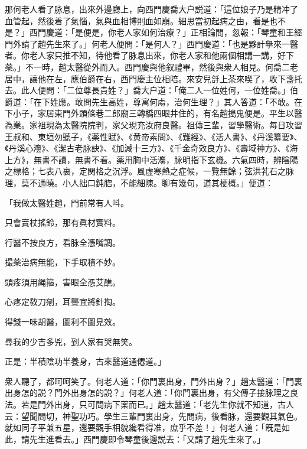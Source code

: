那何老人看了脉息，出來外邊廳上，向西門慶喬大户説道：「這位娘子乃是精冲了血管起，然後着了氣惱，氣與血相博則血如崩。細思當初起病之由，看是也不是？」西門慶道：「是便是，你老人家如何治療？」正相論間，忽報：「琴童和王經門外請了趙先生來了。」何老人便問：「是何人？」西門慶道：「也是夥計擧來一醫者。你老人家只推不知，待他看了脉息出來，你老人家和他兩個相講一講，好下薬。」不一時，趙太醫從外而入。西門慶與他叙禮畢，然後與衆人相見。何喬二老居中，讓他在左，應伯爵在右，西門慶主位相陪。來安兒㧱上茶來喫了，收下盞托去。此人便問：「二位尊長貴姓？」喬大户道：「俺二人一位姓何，一位姓喬。」伯爵道：「在下姓應。敢問先生高姓，尊寓何䖏，治何生理？」其人答道：「不敢。在下小子，家居東門外頭條巷二郎廟三轉橋四眼井住的，有名趙搗鬼便是。平生以醫為業。家祖現為太醫院院判，家父現充汝府良醫。祖傳三輩，習學醫術。每日攻習王叔和、東垣勿聽子，《薬性賦》、《黄帝素問》、《難經》、《活人書》、《丹溪纂要》、《丹溪心灋》、《潔古老脉訣》、《加減十三方》、《千金奇效良方》、《壽域神方》、《海上方》，無書不讀，無書不看。薬用胸中活灋，脉明指下玄機。六氣四時，辨陰陽之標格；七表八裏，定関格之沉浮。風虚寒熱之症候，一覽無餘；弦洪芤石之脉理，莫不通曉。小人拙口鈍脗，不能細陳。聊有幾句，道其梗概。」便道：

\begin{myquote}
「我做太醫姓趙，門前常有人呌。

只會賣杖搖鈴，那有眞材實料。　

行醫不按良方，看脉全憑嘴調。

撮薬治病無能，下手取積不妙。

頭疼須用䋲箍，害眼全憑艾醮。

心疼定敎刀剜，耳聾宜將針掏。

得錢一味胡醫，圖利不圖見效。

尋我的少吉多兇，到人家有哭無笑。

正是：半積陰功半養身，古來醫道通僊道。」
\end{myquote}

衆人聽了，都呵呵笑了。何老人道：「你門裏出身，門外出身？」趙太醫道：「門裏出身怎的説？門外出身怎的説？」何老人道：「你門裏出身，有父傳子接脉理之良法。若是門外出身，只可問病下薬而已。」趙太醫道：「老先生你就不知道，古人云：望聞問切，神聖功巧。學生三輩門裏出身，先問病，後看脉，還要觀其氣色。就如同子平兼五星，還要觀手相貌纔看得准，庶乎不差！」何老人道：「旣是如此，請先生進看去。」西門慶即令琴童後邊説去：「又請了趙先生來了。」

